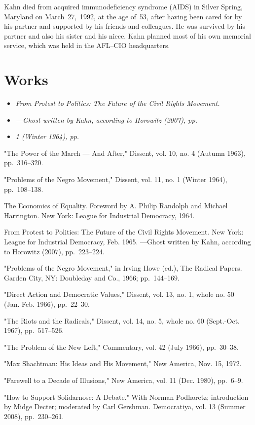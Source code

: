 Kahn died from acquired immunodeficiency syndrome (AIDS) in Silver
Spring, Maryland on March~27,~1992, at the age of~53, after having been
cared for by his partner and supported by his friends and colleagues. He
was survived by his partner and also his sister and his niece. Kahn
planned most of his own memorial service, which was held in the AFL--CIO
headquarters.

\section{Works}\label{works}

\begin{itemize}
\item
  \emph{From Protest to Politics: The Future of the Civil Rights
  Movement.}
\item
  \emph{---Ghost written by Kahn, according to Horowitz (2007), pp.}
\item
  \emph{1 (Winter 1964), pp.}
\end{itemize}

"The Power of the March --- And After," Dissent, vol. 10, no. 4 (Autumn
1963), pp.~316--320.

"Problems of the Negro Movement," Dissent, vol. 11, no. 1 (Winter 1964),
pp.~108--138.

The Economics of Equality. Foreword by A. Philip Randolph and Michael
Harrington. New York: League for Industrial Democracy, 1964.

From Protest to Politics: The Future of the Civil Rights Movement. New
York: League for Industrial Democracy, Feb. 1965. ---Ghost written by
Kahn, according to Horowitz (2007), pp.~223--224.

"Problems of the Negro Movement," in Irving Howe (ed.), The Radical
Papers. Garden City, NY: Doubleday and Co., 1966; pp.~144--169.

"Direct Action and Democratic Values," Dissent, vol. 13, no. 1, whole
no. 50 (Jan.-Feb. 1966), pp.~22--30.

"The Riots and the Radicals," Dissent, vol. 14, no. 5, whole no. 60
(Sept.-Oct. 1967), pp.~517--526.

"The Problem of the New Left," Commentary, vol. 42 (July 1966),
pp.~30--38.

"Max Shachtman: His Ideas and His Movement," New America, Nov. 15, 1972.

"Farewell to a Decade of Illusions," New America, vol. 11 (Dec. 1980),
pp.~6--9.

"How to Support Solidarnosc: A Debate." With Norman Podhoretz;
introduction by Midge Decter; moderated by Carl Gershman. Democratiya,
vol. 13 (Summer 2008), pp.~230--261.

